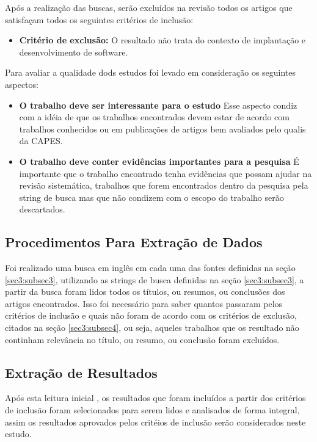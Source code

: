 \documentclass[12pt]{article}
\begin{document}
 Após a realização das buscas, serão excluídos na revisão todos os artigos que satisfaçam todos os seguintes critérios de inclusão:

 \begin{itemize}
   \item  \textbf{Critério de exclusão:} O resultado não trata do contexto de implantação e desenvolvimento de software.
 \end{itemize}
 
Para avaliar a qualidade dods estudos foi levado em consideração os seguintes aspectos:

 \begin{itemize}
   \item  \textbf{O trabalho deve ser interessante para o estudo} Esse aspecto condiz com a idéia de que os trabalhos encontrados devem estar de acordo com trabalhos conhecidos ou em publicações de artigos bem avaliados pelo qualis da CAPES.
   \item  \textbf{O trabalho deve conter evidências importantes para a pesquisa} É importante que o trabalho encontrado tenha evidências que possam ajudar na revisão sistemática, trabalhos que forem encontrados dentro da pesquisa pela string de busca mas que não condizem com o escopo do trabalho serão descartados.
 \end{itemize}
 
\subsection{Procedimentos Para Extração de Dados} \label{sec3:subsec5}

Foi realizado uma busca em inglês em cada uma das fontes definidas na seção \ref{sec3:subsec3}, utilizando as strings de busca definidas na seção \ref{sec3:subsec3}, a partir da busca foram lidos todos os títulos, ou resumos, ou conclusões dos artigos encontrados. Isso foi necessário para saber quantos passaram pelos critérios de inclusão e quais não foram de acordo com os critérios de exclusão, citados na seção \ref{sec3:subsec4}, ou seja, aqueles trabalhos que os resultado não continham relevância no título, ou resumo, ou conclusão foram excluídos.

\subsection{Extração de Resultados} \label{sec3:subsec6}

Após  esta leitura inicial ,  os  resultados que foram incluídos a partir dos critérios de inclusão foram  selecionados  para  serem  lidos e  analisados de forma integral, assim os resultados aprovados pelos critéios de inclusão serão considerados neste estudo.
\end{document}
